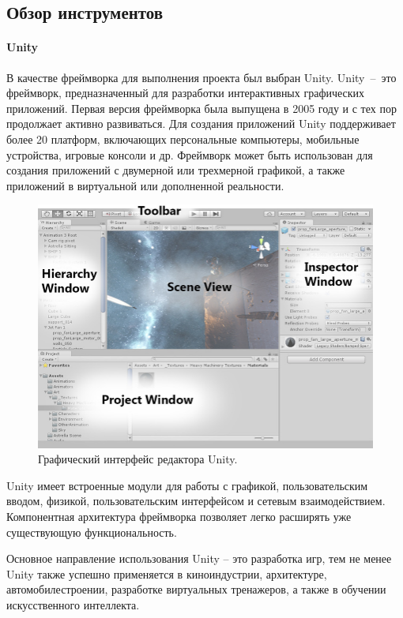 ﻿\subsection{Обзор инструментов}

\paragraph{Unity}

В качестве фреймворка для выполнения проекта был выбран Unity.
Unity~--~это фреймворк, предназначенный для разработки интерактивных графических приложений.%
\cite{DocUnity}
Первая версия фреймворка была выпущена в 2005 году
и с тех пор продолжает активно развиваться.
Для создания приложений Unity поддерживает более 20 платформ,
включающих персональные компьютеры, мобильные устройства, игровые консоли и др.
Фреймворк может быть использован для создания приложений
с двумерной или трехмерной графикой, а также приложений
в виртуальной или дополненной реальности.

\begin{figure}[h]
    \includegraphics[width=\textwidth]{images/Editor-Breakdown.jpg}
    \caption{Графический интерфейс редактора Unity.%
    \cite{DocUnity}}
    \label{figure:UnityInterface}
\end{figure}

Unity имеет встроенные модули для работы с
графикой, пользовательским вводом, физикой,
пользовательским интерфейсом и сетевым взаимодействием.
Компонентная архитектура фреймворка позволяет
легко расширять уже существующую функциональность.

Основное направление использования Unity -- это разработка игр,
тем не менее Unity также успешно применяется в киноиндустрии,\cite{UnityInFilmmaking}
архитектуре, автомобилестроении,\cite{UnityInAutomotive}
разработке виртуальных тренажеров, а также в
обучении искусственного интеллекта.\cite{UnityInAI}

